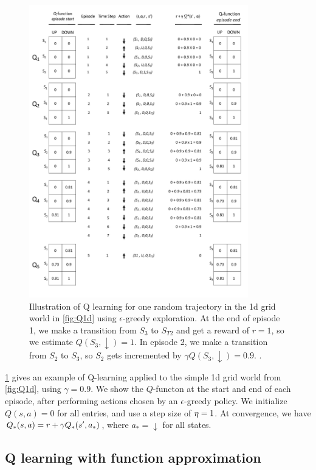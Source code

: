 \begin{figure}
\centering
\includegraphics[height=5in]{figs/DRL-3-3}
\caption{
  Illustration of Q learning for one random trajectory
  in the 1d grid world
  in \cref{fig:Q1d} using $\epsilon$-greedy exploration.
  At the end of episode 1, we make a transition
  from $S_3$ to $S_{T2}$ and get a reward of $r=1$,
  so we estimate $Q(S_3,\downarrow)=1$.
  In episode 2, we make a transition from $S_2$ to $S_3$,
  so $S_2$ gets incremented by $\gamma Q(S_3,\downarrow)=0.9$.
  .
}
\label{fig:DRLTD}
\end{figure}

\cref{fig:DRLTD} gives an example
of Q-learning applied to the simple 1d grid world
from \cref{fig:Q1d}, using $\gamma=0.9$.
We show the $Q$-functon at the start and end of each episode,
after performing actions chosen by an $\epsilon$-greedy policy.
We initialize $Q(s,a)=0$ for all entries,
and use a step size of $\eta=1$.
At convergence, we have
$Q_{*}(s,a) = r + \gamma Q_{*}(s',a_*)$,
where $a_* = \downarrow$ for all states.




\subsection{Q learning with function approximation}
\label{sec:Qfn}

